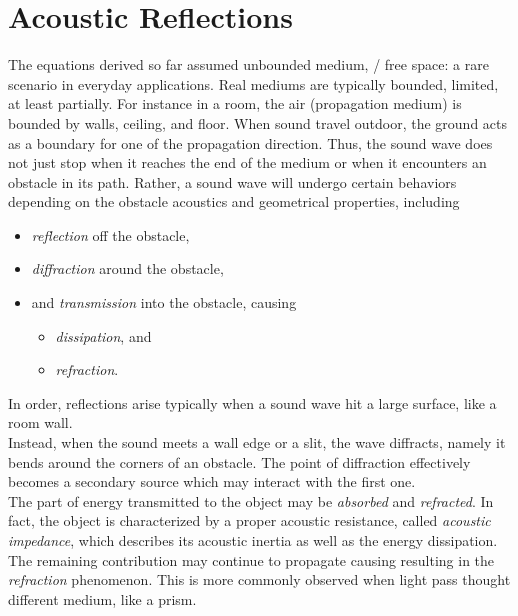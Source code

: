 
\section{Acoustic Reflections}\label{ch:acoustics:sec:reflection}

The equations derived so far assumed unbounded medium, \ie/ free space: a rare scenario in everyday applications.
Real mediums are typically bounded, limited, at least partially.
For instance in a room, the air (propagation medium) is bounded by walls, ceiling, and floor.
When sound travel outdoor, the ground acts as a boundary for one of the propagation direction.
Thus, the sound wave does not just stop when it reaches the end of the medium or when it encounters an obstacle in its path.
Rather, a sound wave will undergo certain behaviors depending on the obstacle acoustics and geometrical properties, including
\begin{itemize}
    \item \textit{reflection} off the obstacle,
    \item \textit{diffraction} around the obstacle,
    \item and \textit{transmission} into the obstacle, causing
    \begin{itemize}
        \item \textit{dissipation}, and
        \item \textit{refraction}.
    \end{itemize}
\end{itemize}

In order, reflections arise typically when a sound wave hit a large surface, like a room wall.
\\Instead, when the sound meets a wall edge or a slit, the wave diffracts, namely it bends around the corners of an obstacle.
The point of diffraction effectively becomes a secondary source which may interact with the first one.
\\The part of energy transmitted to the object may be \textit{absorbed} and \textit{refracted}.
In fact, the object is characterized by a proper acoustic resistance, called \textit{acoustic impedance}, which
describes its acoustic inertia as well as the energy dissipation.
The remaining contribution may continue to propagate causing resulting in the \textit{refraction} phenomenon.
This is more commonly observed when light pass thought different medium, like a prism.

